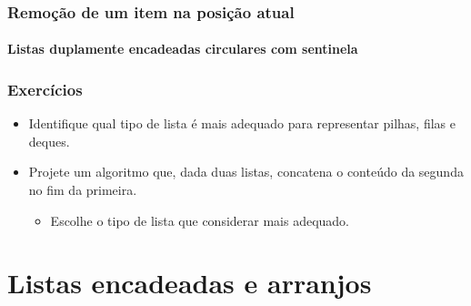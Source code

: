 \documentclass{beamer}
\begin{document}
\begin{frame}
  \frametitle{Remoção de um item na posição atual}
  \framesubtitle{Listas duplamente encadeadas circulares com sentinela}

  \begin{codebox}
    \zi {}
    \zi {}
    \zi {}
  \end{codebox}


\end{frame}

\begin{frame}

  \frametitle{Exercícios}

  \begin{itemize}
    \item Identifique qual tipo de lista é mais adequado para representar pilhas, filas e deques.
    \item Projete um algoritmo que, dada duas listas, concatena o conteúdo da segunda no fim da primeira.
      \begin{itemize}
        \item Escolhe o tipo de lista que considerar mais adequado.
      \end{itemize}
  \end{itemize}
\end{frame}

\section{Listas encadeadas e arranjos}
\end{document}
